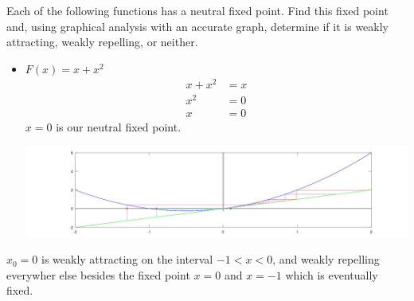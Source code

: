\documentclass[12pt]{article}
\newenvironment{exercise}[2][Exercise]{\begin{trivlist}
\item[\hskip \labelsep {\bfseries #1} \hskip \labelsep {\bfseries #2.}]}{\end{trivlist}}
\begin{document}
\begin{exercise}{4}
	Each of the following functions has a neutral fixed point. Find this fixed point and, using graphical analysis with an accurate graph, determine if it is weakly attracting, weakly repelling, or neither.
	\begin{itemize}
		\item[a.] $F(x) = x + x^2$
			\begin{align*}
				x + x^2 &= x \\
				x^2 &= 0 \\
				x &= 0
			\end{align*}	
			$x = 0$ is our neutral fixed point.
			\begin{center}
				\includegraphics[scale = 0.23]{Fig2.5.4a.jpg}
			\end{center}
	\end{itemize}
	$x_0 = 0$ is weakly attracting on the interval $-1 < x < 0$, and weakly repelling everywher else besides the fixed point $x = 0$ and $x = -1$ which is eventually fixed.
\end{exercise}
\end{document}
